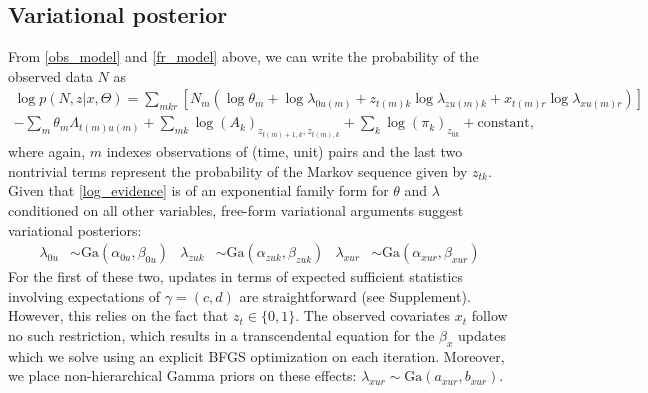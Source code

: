 \documentclass{article} %
\begin{document}
\subsection{Variational posterior}
From \ref{obs_model} and \ref{fr_model} above, we can write the probability of the observed data $N$ as
\begin{multline}
    \label{log_evidence}
    \log p(N, z|x, \Theta) = \sum_{mkr} \left[ 
        N_m \left( \log \theta_m +
            \log \lambda_{0u(m)} +
            z_{t(m) k} \log \lambda_{zu(m) k} + 
            x_{t(m) r} \log \lambda_{xu(m) r}
            \right)
    \right] \\
    - \sum_m \theta_m \Lambda_{t(m) u(m)} + 
    \sum_{mk} \log (A_k)_{z_{t(m)+1, k}, z_{t(m), k}} + 
    \sum_k \log (\pi_k)_{z_{0k}} + \text{constant,}
\end{multline}
where again, $m$ indexes observations of (time, unit) pairs and the last two nontrivial terms represent the probability of the Markov sequence given by $z_{tk}$. Given that \ref{log_evidence} is of an exponential family form for $\theta$ and $\lambda$ conditioned on all other variables, free-form variational arguments \cite{Blei2006-oh} suggest variational posteriors:
\begin{align}
    \lambda_{0u} &\sim \text{Ga}(\alpha_{0u}, \beta_{0u}) &
    \lambda_{zuk} &\sim \text{Ga}(\alpha_{zuk}, \beta_{zuk}) &
    \lambda_{xur} &\sim \text{Ga}(\alpha_{xur}, \beta_{xur})
\end{align}
For the first of these two, updates in terms of expected sufficient statistics involving expectations of $\gamma = (c, d)$ are straightforward (see Supplement). However, this relies on the fact that $z_t \in \lbrace0, 1\rbrace$. The observed covariates $x_t$ follow no such restriction, which results in a transcendental equation for the $\beta_x$ updates which we solve using an explicit BFGS optimization on each iteration. Moreover, we place non-hierarchical Gamma priors on these effects: $\lambda_{xur} \sim \text{Ga}(a_{xur}, b_{xur})$.
\end{document}
